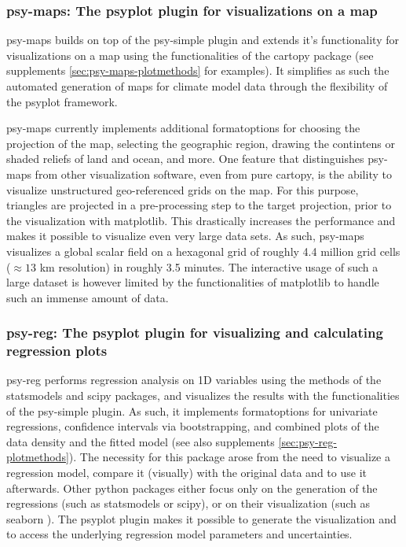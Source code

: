 \begin{refsection}
\subsubsection{psy-maps: The psyplot plugin for visualizations on a map}

psy-maps builds on top of the psy-simple plugin and extends it's functionality for visualizations on a map using the functionalities of the cartopy package \citep{Cartopy} (see supplements \ref{sec:psy-maps-plotmethods} for examples). It simplifies as such the automated generation of maps for climate model data through the flexibility of the psyplot framework.

psy-maps currently implements additional formatoptions for choosing the projection of the map, selecting the geographic region, drawing the contintens or shaded reliefs of land and ocean, and more. One feature that distinguishes psy-maps from other visualization software, even from pure cartopy, is the ability to visualize unstructured geo-referenced grids on the map. For this purpose, triangles are projected in a pre-processing step to the target projection, prior to the visualization with matplotlib. This drastically increases the performance and makes it possible to visualize even very large data sets. As such, psy-maps visualizes a global scalar field on a hexagonal grid of roughly 4.4 million grid cells ($\approx 13$ km resolution) in roughly 3.5 minutes. The interactive usage of such a large dataset is however limited by the functionalities of matplotlib to handle such an immense amount of data.

\subsubsection{psy-reg: The psyplot plugin for visualizing and calculating regression plots}

psy-reg performs regression analysis on 1D variables using the methods of the statsmodels \citep{SeaboldPerktold2010} and scipy \citep{JonesOliphantPetersonEtAl2001, Oliphant2007} packages, and visualizes the results with the functionalities of the psy-simple plugin. As such, it implements formatoptions for univariate regressions, confidence intervals via bootstrapping, and combined plots of the data density and the fitted model (see also supplements \ref{sec:psy-reg-plotmethods}). The necessity for this package arose from the need to visualize a regression model, compare it (visually) with the original data and to use it afterwards. Other python packages either focus only on the generation of the regressions (such as statsmodels or scipy), or on their visualization (such as seaborn \citep{WaskomBotvinnikOKaneEtAl2018}). The psyplot plugin makes it possible to generate the visualization and to access the underlying regression model parameters and uncertainties.


\end{refsection}
